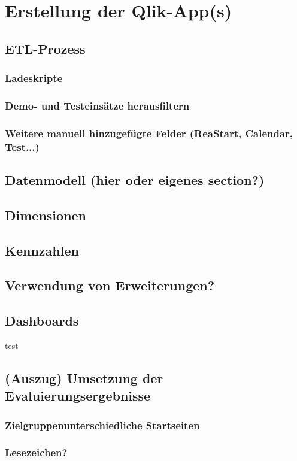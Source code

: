 \section{Erstellung der Qlik-App(s)}
\subsection{ETL-Prozess}
\subsubsection{Ladeskripte}
\subsubsection{Demo- und Testeinsätze herausfiltern}
\subsubsection{Weitere manuell hinzugefügte Felder (ReaStart, Calendar, Test...)}
\subsection{Datenmodell (hier oder eigenes section?)}
\subsection{Dimensionen}
\subsection{Kennzahlen}
\subsection{Verwendung von Erweiterungen?}
\subsection{Dashboards}
test
\subsection{(Auszug) Umsetzung der Evaluierungsergebnisse}
\subsubsection{Zielgruppenunterschiedliche Startseiten}
\subsubsection{Lesezeichen?} %
